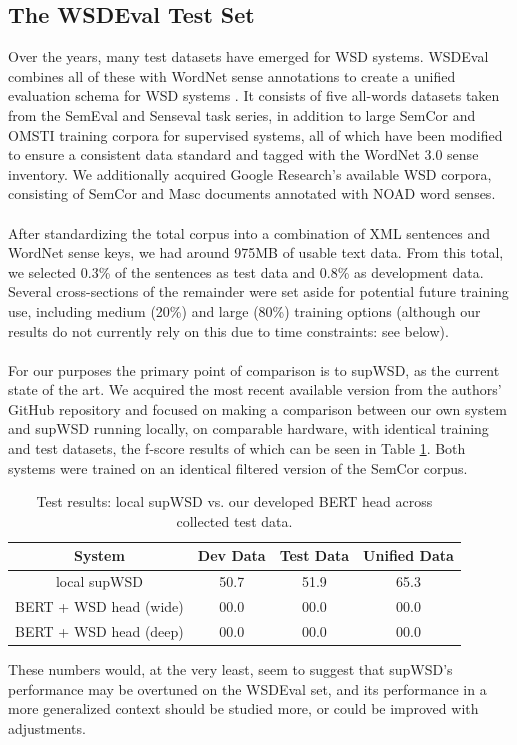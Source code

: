 \documentclass{IEEEtran}
\begin{document}
\subsection{The WSDEval Test Set}
	Over the years, many test datasets have emerged for WSD systems. WSDEval combines all of these with WordNet sense annotations to create a unified evaluation schema for WSD systems \cite{wsdeval}. It consists of five all-words datasets taken from the SemEval and Senseval task series, in addition to large SemCor and OMSTI training corpora for supervised systems, all of which have been modified to ensure a consistent data standard and tagged with the WordNet 3.0 sense inventory. We additionally acquired Google Research's available WSD corpora, consisting of SemCor and Masc documents annotated with NOAD word senses.
	\\ \\
	After standardizing the total corpus into a combination of XML sentences and WordNet sense keys, we had around 975MB of usable text data. From this total, we selected 0.3\% of the sentences as test data and 0.8\% as development data. Several cross-sections of the remainder were set aside for potential future training use, including medium (20\%) and large (80\%) training options (although our results do not currently rely on this due to time constraints: see below).
	\\ \\
	For our purposes the primary point of comparison is to supWSD, as the current state of the art. We acquired the most recent available version from the authors' GitHub repository and focused on making a comparison between our own system and supWSD running locally, on comparable hardware, with identical training and test datasets, the f-score results of which can be seen in Table \ref{table:fscore1}. Both systems were trained on an identical filtered version of the SemCor corpus.
	\begin{table}[h]
		\centering
		\begin{tabular}{|c|ccc|}
			System & Dev Data & Test Data & Unified Data \\
			\hline
			local supWSD & 50.7 & 51.9 & 65.3 \\
			BERT + WSD head (wide) & 00.0 & 00.0 & 00.0 \\
			BERT + WSD head (deep) & 00.0 & 00.0 & 00.0
		\end{tabular}
		\caption{Test results: local supWSD vs. our developed BERT head across collected test data.}
		\label{table:fscore1}
	\end{table}
	These numbers would, at the very least, seem to suggest that supWSD's performance may be overtuned on the WSDEval set, and its performance in a more generalized context should be studied more, or could be improved with adjustments. 
	
\end{document}
